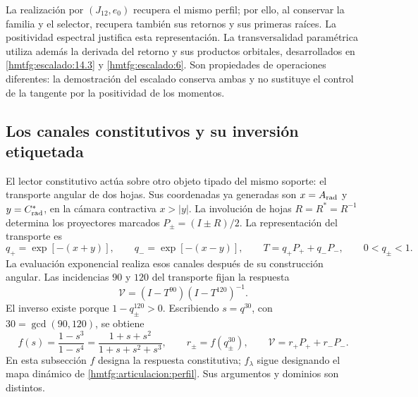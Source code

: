 La realización por \((J_{12},e_0)\) recupera el mismo perfil;
por ello, al conservar la familia y el selector, recupera también
sus retornos y sus primeras raíces. La positividad espectral
justifica esta representación. La transversalidad paramétrica
utiliza además la derivada del retorno y sus productos orbitales,
desarrollados en \ref{hmtfg:escalado:14.3} y
\ref{hmtfg:escalado:6}. Son propiedades de operaciones diferentes:
la demostración del escalado conserva ambas y no sustituye el
control de la tangente por la positividad de los momentos.

\subsection{Los canales constitutivos y su inversión etiquetada}
\label{hmtfg:articulacion:constitutiva}

El lector constitutivo actúa sobre otro objeto tipado del mismo
soporte: el transporte angular de dos hojas. Sus coordenadas ya
generadas son \(x=A_{\rm rad}\) y \(y=C^*_{\rm rad}\), en la
cámara contractiva \(x>|y|\). La involución de hojas
\(R=R^*=R^{-1}\) determina los proyectores marcados
\(P_\pm=(I\pm R)/2\). La representación del transporte es
\begin{equation}
 q_+=\exp[-(x+y)],\qquad q_-=\exp[-(x-y)],\qquad
 T=q_+P_++q_-P_-,\qquad 0<q_\pm<1.
 \label{hmtfg:articulacion:canales}
\end{equation}
La evaluación exponencial realiza esos canales después de su
construcción angular. Las incidencias \(90\) y \(120\) del
transporte fijan la respuesta
\[
 \mathcal V=(I-T^{90})(I-T^{120})^{-1}.
\]
El inverso existe porque \(1-q_\pm^{120}>0\).
Escribiendo \(s=q^{30}\), con \(30=\gcd(90,120)\), se obtiene
\begin{equation}
 f(s)=\frac{1-s^3}{1-s^4}
     =\frac{1+s+s^2}{1+s+s^2+s^3},\qquad
 r_\pm=f(q_\pm^{30}),\qquad
 \mathcal V=r_+P_++r_-P_-.
 \label{hmtfg:articulacion:respuesta}
\end{equation}
En esta subsección \(f\) designa la respuesta constitutiva;
\(f_\lambda\) sigue designando el mapa dinámico de
\eqref{hmtfg:articulacion:perfil}. Sus argumentos y dominios
son distintos.


